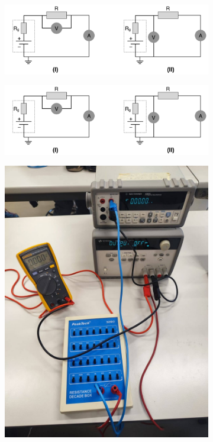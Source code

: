 \documentclass[notitlepage]{report}
\numberwithin{equation}{section}
\theoremstyle{plain}
\theoremstyle{definition}
\theoremstyle{remark}
\begin{document}
\begin{figure}[ht]
    \centering
    \begin{subfigure}[h]{0.45\textwidth}
        \includegraphics[width=\textwidth, trim={1cm 0 26cm 0}, clip]{figures/setup1.png}\caption{}\label{fig:setup1.11}
    \end{subfigure}
    \begin{subfigure}[h]{0.45\textwidth}
        \includegraphics[width=\textwidth, trim={28cm 0 0 0}, clip]{figures/setup1.png}\caption{}\label{fig:setup1.12}
    \end{subfigure}
    \begin{subfigure}[h]{0.45\textwidth}
        \includegraphics[width=\textwidth]{figures/setup2.jpg}\caption{}\label{fig:setup1.13}

\end{subfigure}
\end{figure}
\end{document}

